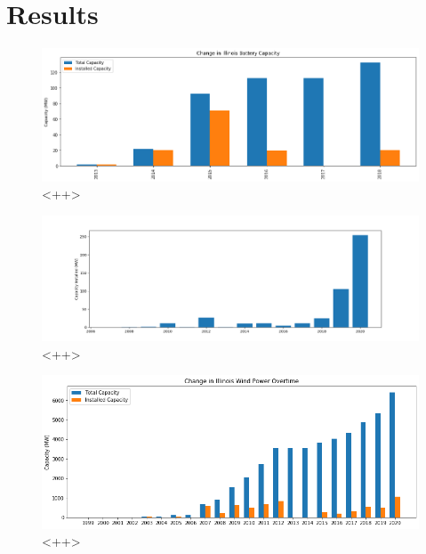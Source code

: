 \section{Results}






\begin{figure}[ht]
	\centering
	\includegraphics[width=\columnwidth]{./img/annual_installed_cap_battery.png}
	\caption{<++>}
	\label{fig:<++>}
\end{figure}


\begin{figure}[ht]
	\centering
	\includegraphics[width=\columnwidth]{./img/annual_installed_cap_solar.png}
	\caption{<++>}
	\label{fig:<++>}
\end{figure}


\begin{figure}[ht]
	\centering
	\includegraphics[width=\columnwidth]{./img/annual_installed_cap_wind.png}
	\caption{<++>}
	\label{fig:<++>}
\end{figure}


